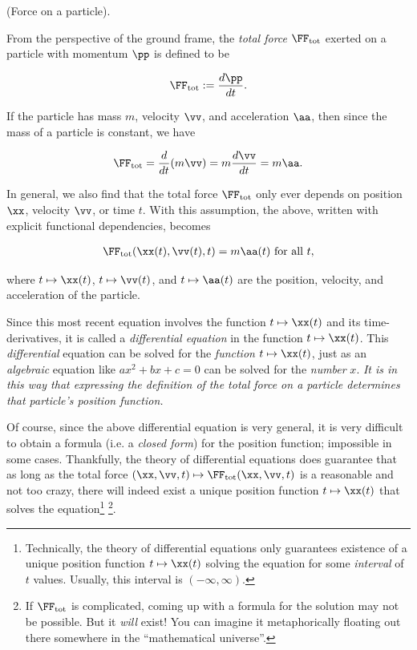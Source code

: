 \documentclass{article}
\begin{document}
\begin{defn}
	\label{N2_defn_part_particle}
	(Force on a particle).
	
	From the perspective of the ground frame, the \textit{total force} $\FF_{\text{tot}}$ exerted on a particle with momentum $\pp$ is defined to be
	
	\begin{align*}
		\FF_{\text{tot}} := \frac{d\pp}{dt}.
	\end{align*}
	
	If the particle has mass $m$, velocity $\vv$, and acceleration $\aa$, then since the mass of a particle is constant, we have
	
	\begin{align*}
		\FF_{\text{tot}} = \frac{d}{dt}(m\vv) = m \frac{d\vv}{dt} = m\aa.
	\end{align*}
	
	In general, we also find that the total force $\FF_{\text{tot}}$ only ever depends on position $\xx$, velocity $\vv$, or time $t$. With this assumption, the above, written with explicit functional dependencies, becomes
	
	\begin{align*}
		\FF_{\text{tot}}(\xx(t), \vv(t), t) = m\aa(t) \text{ for all $t$},
	\end{align*}
	
	where $t \mapsto \xx(t)$, $t \mapsto \vv(t)$, and $t \mapsto \aa(t)$ are the position, velocity, and acceleration of the particle.
\end{defn}

Since this most recent equation involves the function $t \mapsto \xx(t)$ and its time-derivatives, it is called a \textit{differential equation} in the function $t \mapsto \xx(t)$. This \textit{differential} equation can be solved for the \textit{function} $t \mapsto \xx(t)$, just as an \textit{algebraic} equation like $ax^2 + bx + c = 0$ can be solved for the \textit{number} $x$. \textit{It is in this way that expressing the definition of the total force on a particle determines that particle's position function.}

Of course, since the above differential equation is very general, it is very difficult to obtain a formula (i.e. a \textit{closed form}) for the position function; impossible in some cases. Thankfully, the theory of differential equations does guarantee that as long as the total force $(\xx, \vv, t) \mapsto \FF_{\text{tot}}(\xx, \vv, t)$ is a reasonable and not too crazy, there will indeed exist a unique position function $t \mapsto \xx(t)$ that solves the equation\footnote{Technically, the theory of differential equations only guarantees existence of a unique position function $t \mapsto \xx(t)$ solving the equation for some \textit{interval} of $t$ values. Usually, this interval is $(-\infty, \infty)$.} \footnote{If $\FF_{\text{tot}}$ is complicated, coming up with a formula for the solution may not be possible. But it \textit{will} exist! You can imagine it metaphorically floating out there somewhere in the ``mathematical universe''.}. 
\end{document}
